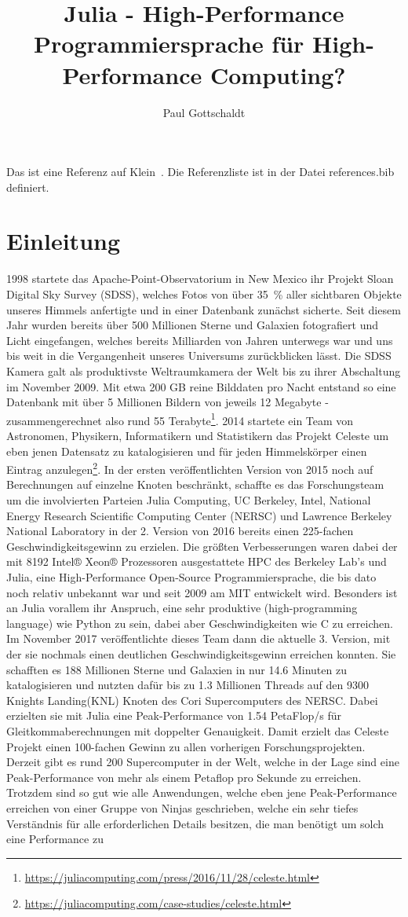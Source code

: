 \documentclass[proseminar,german,utf8]{zihpub}
\author{Paul Gottschaldt}
\title{Julia - High-Performance Programmiersprache für High-Performance Computing?}
\begin{document}
Das ist eine Referenz auf Klein~\cite{blackholes}. Die Referenzliste ist in der Datei references.bib definiert.
\section {Einleitung}
1998 startete das Apache-Point-Observatorium in New Mexico ihr Projekt Sloan Digital Sky Survey (SDSS), welches Fotos von über 35~\% aller sichtbaren Objekte unseres Himmels anfertigte und in einer Datenbank zunächst sicherte. Seit diesem Jahr wurden bereits über 500 Millionen Sterne und Galaxien fotografiert und Licht eingefangen, welches bereits Milliarden von Jahren unterwegs war und uns bis weit in die Vergangenheit unseres Universums zurückblicken lässt. Die SDSS Kamera galt als produktivste Weltraumkamera der Welt bis zu ihrer Abschaltung im November 2009. Mit etwa 200 GB reine Bilddaten pro Nacht entstand so eine Datenbank mit über 5 Millionen Bildern von jeweils 12 Megabyte - zusammengerechnet also rund 55 Terabyte\footnote{\url{https://juliacomputing.com/press/2016/11/28/celeste.html}}. 2014 startete ein Team von Astronomen, Physikern, Informatikern und Statistikern das Projekt Celeste um eben jenen Datensatz zu katalogisieren und für jeden Himmelskörper einen Eintrag anzulegen\footnote{\url{https://juliacomputing.com/case-studies/celeste.html}}. In der ersten veröffentlichten Version von 2015 noch auf Berechnungen auf einzelne Knoten beschränkt, schaffte es das Forschungsteam um die involvierten Parteien Julia Computing, UC Berkeley, Intel, National Energy Research Scientific Computing Center (NERSC) und Lawrence Berkeley National Laboratory in der 2. Version von 2016 bereits einen 225-fachen Geschwindigkeitsgewinn zu erzielen. Die größten Verbesserungen waren dabei der mit 8192 Intel® Xeon® Prozessoren ausgestattete HPC des Berkeley Lab's und Julia, eine High-Performance Open-Source Programmiersprache, die bis dato noch relativ unbekannt war und seit 2009 am MIT entwickelt wird. Besonders ist an Julia vorallem ihr Anspruch, eine sehr produktive (high-programming language) wie Python zu sein, dabei aber Geschwindigkeiten wie C zu erreichen. Im November 2017 veröffentlichte dieses Team dann die aktuelle 3. Version, mit der sie nochmals einen deutlichen Geschwindigkeitsgewinn erreichen konnten. Sie schafften es 188 Millionen Sterne und Galaxien in nur 14.6 Minuten zu katalogisieren und nutzten dafür bis zu 1.3 Millionen Threads auf den 9300 Knights Landing(KNL) Knoten des Cori Supercomputers des NERSC. Dabei erzielten sie mit Julia eine Peak-Performance von 1.54 PetaFlop/s für Gleitkommaberechnungen mit doppelter Genauigkeit. Damit erzielt das Celeste Projekt einen 100-fachen Gewinn zu allen vorherigen Forschungsprojekten. Derzeit gibt es rund 200 Supercomputer in der Welt, welche in der Lage sind eine Peak-Performance von mehr als einem Petaflop pro Sekunde zu erreichen. Trotzdem sind so gut wie alle Anwendungen, welche eben jene Peak-Performance erreichen von einer Gruppe von Ninjas geschrieben, welche ein sehr tiefes Verständnis für alle erforderlichen Details besitzen, die man benötigt um solch eine Performance zu 
\end{document}
